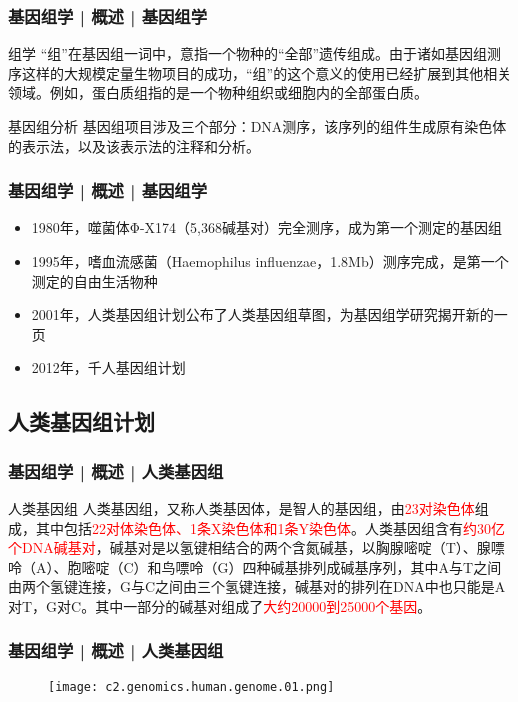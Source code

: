 \begin{frame}
  \frametitle{基因组学 | 概述 | 基因组学}
  \begin{block}{组学}
“组”在基因组一词中，意指一个物种的“全部”遗传组成。由于诸如基因组测序这样的大规模定量生物项目的成功，“组”的这个意义的使用已经扩展到其他相关领域。例如，蛋白质组指的是一个物种组织或细胞内的全部蛋白质。 
  \end{block}
  \pause
  \begin{block}{基因组分析}
基因组项目涉及三个部分：DNA测序，该序列的组件生成原有染色体的表示法，以及该表示法的注释和分析。
  \end{block}
\end{frame}

\begin{frame}
  \frametitle{基因组学 | 概述 | 基因组学}
  \begin{itemize}[<+->]
    \item 1980年，噬菌体Φ-X174（5,368碱基对）完全测序，成为第一个测定的基因组
    \item 1995年，嗜血流感菌（Haemophilus influenzae，1.8Mb）测序完成，是第一个测定的自由生活物种
    \item 2001年，人类基因组计划公布了人类基因组草图，为基因组学研究揭开新的一页
    \item 2012年，千人基因组计划
  \end{itemize}
\end{frame}

\subsection{人类基因组计划}
\begin{frame}
  \frametitle{基因组学 | 概述 | 人类基因组}
  \begin{block}{人类基因组}
人类基因组，又称人类基因体，是智人的基因组，由\textcolor{red}{23对染色体}组成，其中包括\textcolor{red}{22对体染色体、1条X染色体和1条Y染色体}。人类基因组含有\textcolor{red}{约30亿个DNA碱基对}，碱基对是以氢键相结合的两个含氮碱基，以胸腺嘧啶（T）、腺嘌呤（A）、胞嘧啶（C）和鸟嘌呤（G）四种碱基排列成碱基序列，其中A与T之间由两个氢键连接，G与C之间由三个氢键连接，碱基对的排列在DNA中也只能是A对T，G对C。其中一部分的碱基对组成了\textcolor{red}{大约20000到25000个基因}。 
  \end{block}
\end{frame}

\begin{frame}
  \frametitle{基因组学 | 概述 | 人类基因组}
  \begin{figure}
    \centering
    \texttt{[image: c2.genomics.human.genome.01.png]}
  \end{figure}
\end{frame}

